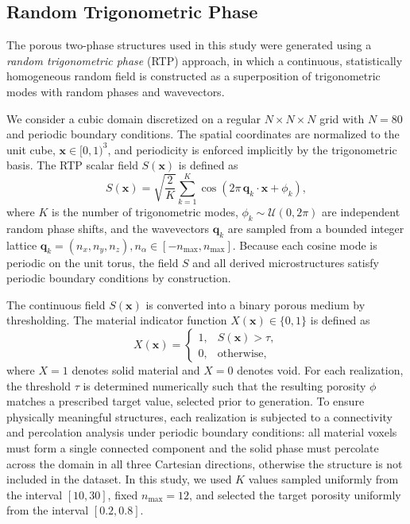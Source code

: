 \documentclass[sn-mathphys,Numbered]{sn-jnl}
\theoremstyle{definition}
\begin{document}
\subsection{Random Trigonometric Phase}

The porous two-phase structures used in this study were generated using a
\emph{random trigonometric phase} (RTP) approach, in which a continuous,
statistically homogeneous random field is constructed as a superposition of
trigonometric modes with random phases and wavevectors.


We consider a cubic domain discretized on a regular
$N \times N \times N$ grid with $N=80$ and periodic boundary conditions.
The spatial coordinates are normalized to the unit cube,
$\mathbf{x} \in [0,1)^3$, and periodicity is enforced implicitly by the
trigonometric basis.
The RTP scalar field $S(\mathbf{x})$ is defined as
\begin{equation}
\label{eqn:rtp_S}
S(\mathbf{x}) =
\sqrt{\frac{2}{K}}
\sum_{k=1}^{K}
\cos\!\left( 2\pi\,\mathbf{q}_k \cdot \mathbf{x} + \phi_k \right),
\end{equation}
where $K$ is the number of trigonometric modes,
$\phi_k \sim \mathcal{U}(0,2\pi)$ are independent random phase shifts, and the
wavevectors $\mathbf{q}_k$ are sampled from a bounded integer lattice $\mathbf{q}_k = (n_x, n_y, n_z), n_\alpha \in [-n_\text{max}, n_\text{max}].$
Because each cosine mode is periodic on the unit torus, the field $S$ and all
derived microstructures satisfy periodic boundary conditions by construction.

The continuous field $S(\mathbf{x})$ is converted into a binary porous medium
by thresholding.
The material indicator function $X(\mathbf{x}) \in \{0,1\}$ is defined as
\[
X(\mathbf{x}) =
\begin{cases}
1, & S(\mathbf{x}) > \tau, \\
0, & \text{otherwise},
\end{cases}
\]
where $X=1$ denotes solid material and $X=0$ denotes void.
For each realization, the threshold $\tau$ is determined numerically such that
the resulting porosity $\phi$ matches a prescribed target value, selected
prior to generation.
To ensure physically meaningful structures, each realization is subjected to a
connectivity and percolation analysis under periodic boundary conditions:
all material voxels must form a single connected component and the solid phase
must percolate across the domain in all three Cartesian directions, otherwise the structure is not included in the dataset.
In this study, we used $K$ values sampled uniformly from the interval $[10, 30]$, fixed $n_{\text{max}} = 12$, and selected the target porosity uniformly from the interval $[0.2, 0.8]$.
\end{document}
